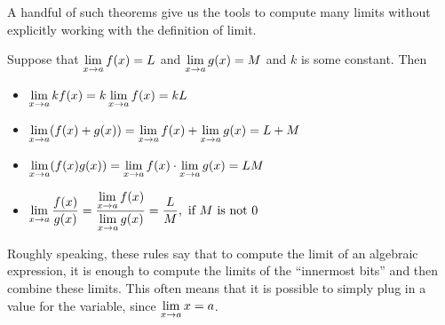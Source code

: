 A handful of such theorems give us the tools to compute many limits
without explicitly working with the definition of limit.

\begin{theorem} Suppose that $\displaystyle \lim_{x\to a}f(x)=L$ and $\displaystyle \lim_{x\to a}g(x)=M$ and
$k$ is some constant. Then
\begin{itemize}
\item $\displaystyle\lim_{x\to a} kf(x) = k\lim_{x\to a}f(x)=kL$ 
\item $\displaystyle\lim_{x\to a} (f(x)+g(x)) = \lim_{x\to a}f(x)+\lim_{x\to a}g(x)=L+M$  
\item $\displaystyle\lim_{x\to a} (f(x)g(x)) = \lim_{x\to a}f(x)\cdot\lim_{x\to a}g(x)=LM$ 
\item $\displaystyle\lim_{x\to a} \frac{f(x)}{g(x)} = \frac{\displaystyle\lim_{x\to a}f(x)}{\displaystyle\lim_{x\to
    a}g(x)}=\frac{L}{M},\text{ if $M$ is not 0}$
\end{itemize}
\label{thm:limit laws}
\end{theorem}

Roughly speaking, these rules say that to compute the limit of an
algebraic expression, it is enough to compute the limits of the
``innermost bits'' and then combine these limits. This often means
that it is possible to simply plug in a value for the variable, since
$\displaystyle \lim_{x\to a} x =a$.
